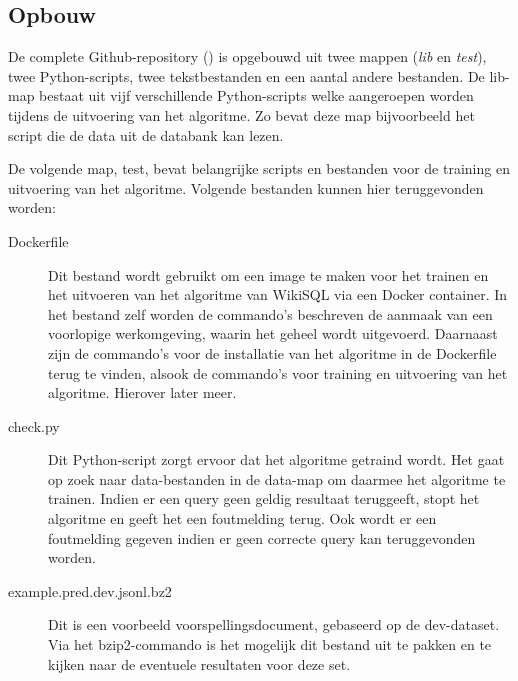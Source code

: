 \subsection{Opbouw}

De complete Github-repository (\textcite{wikisql}) is opgebouwd uit twee mappen (\textit{lib} en \textit{test}), twee Python-scripts, twee tekstbestanden en een aantal andere bestanden. De lib-map bestaat uit vijf verschillende Python-scripts welke aangeroepen worden tijdens de uitvoering van het algoritme. Zo bevat deze map bijvoorbeeld het script die de data uit de databank kan lezen. 

De volgende map, test, bevat belangrijke scripts en bestanden voor de training en uitvoering van het algoritme. Volgende bestanden kunnen hier teruggevonden worden:
\begin{description}
	\item[Dockerfile] Dit bestand wordt gebruikt om een image te maken voor het trainen en het uitvoeren van het algoritme van WikiSQL via een Docker container. In het bestand zelf worden de commando's beschreven de aanmaak van een voorlopige werkomgeving, waarin het geheel wordt uitgevoerd. Daarnaast zijn de commando's voor de installatie van het algoritme in de Dockerfile terug te vinden, alsook de commando's voor training en uitvoering van het algoritme. Hierover later meer.
	\item[check.py] Dit Python-script zorgt ervoor dat het algoritme getraind wordt. Het gaat op zoek naar data-bestanden in de data-map om daarmee het algoritme te trainen. Indien er een query geen geldig resultaat teruggeeft, stopt het algoritme en geeft het een foutmelding terug. Ook wordt er een foutmelding gegeven indien er geen correcte query kan teruggevonden worden.
	\item[example.pred.dev.jsonl.bz2] Dit is een voorbeeld voorspellingsdocument, gebaseerd op de dev-dataset. Via het bzip2-commando is het mogelijk dit bestand uit te pakken en te kijken naar de eventuele resultaten voor deze set.
\end{description}

